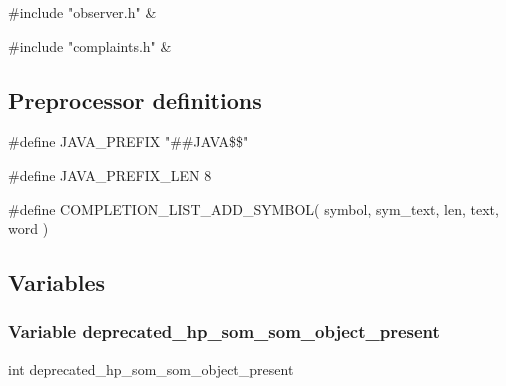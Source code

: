 \medskip
\begin{cxreftabi}
{\stt \#include "observer.h"} &\\
\end{cxreftabi}

\medskip
\begin{cxreftabi}
{\stt \#include "complaints.h"} &\\
\end{cxreftabi}


\subsection*{Preprocessor definitions}

{\stt \#define JAVA\_PREFIX "\#\#JAVA\$\$"}

\medskip
{\stt \#define JAVA\_PREFIX\_LEN 8}

\medskip
{\stt \#define COMPLETION\_LIST\_ADD\_SYMBOL( symbol, sym\_text, len, text, word )}


\subsection{Variables}


\subsubsection{Variable deprecated\_hp\_som\_som\_object\_present}
\label{var_deprecated_hp_som_som_object_present_symtab.c}

{\stt int deprecated\_hp\_som\_som\_object\_present}

